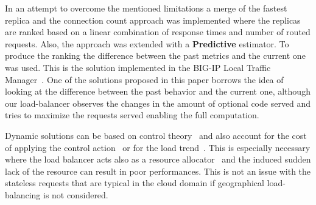 In an attempt to overcome the mentioned limitations a merge of the
fastest replica and the connection count approach was implemented
where the replicas are ranked based on a linear combination of
response times and number of routed requests. Also, the approach was
extended with a \textbf{Predictive} estimator. To produce the ranking
the difference between the past metrics and the current one was
used. This is the solution implemented in the BIG-IP Local Traffic
Manager~\cite{BIGIP}. One of the solutions proposed in this paper
borrows the idea of looking at the difference between the past
behavior and the current one, although our load-balancer observes the
changes in the amount of optional code served and tries to maximize
the requests served enabling the full computation.

Dynamic solutions can be based on control
theory~\cite{multipathctlb,comparisonstaticdynamic} and also account
for the cost of applying the control action~\cite{costofcontrol} or for
the load trend~\cite{CasolariSA}. This is especially necessary where 
the load balancer acts also as a resource 
allocator~\cite{Ardagnaalltogether} and the induced sudden lack of the 
resource can result in poor performances. This is not an issue with the 
stateless requests that are typical in the cloud domain if geographical
load-balancing is not considered.

